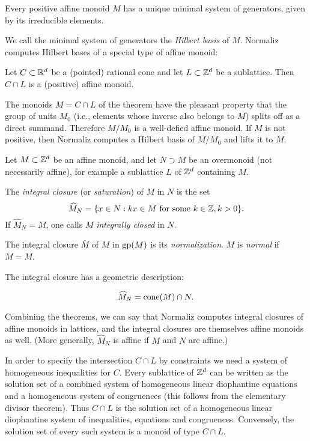 \begin{theorem}
	Every positive affine monoid $M$ has a unique minimal system of generators, given by its irreducible elements.
\end{theorem}

We call the minimal system of generators the \emph{Hilbert basis} of $M$. Normaliz computes Hilbert bases of a special type of affine monoid:

\begin{theorem}
	Let $C\subset{\mathbb R}^d$ be a (pointed) rational cone and let $L\subset {\mathbb Z}^d$ be a sublattice. Then $C\cap L$ is a (positive) affine monoid.
\end{theorem}

The monoids $M=C\cap L$ of the theorem have the pleasant property that the group of units $M_0$ (i.e., elements whose inverse also belongs to $M$) splits off as a direct summand. Therefore $M/M_0$ is a well-defied affine monoid. If $M$ is not positive, then Normaliz computes a Hilbert basis of $M/M_0$ and lifts it to $M$.

Let $M\subset {\mathbb Z}^d$ be an affine monoid, and let $N\supset M$ be an overmonoid (not necessarily affine), for example a sublattice $L$ of ${\mathbb Z}^d$ containing $M$.

\begin{definition}
	The \emph{integral closure} (or \emph{saturation}) of $M$ in $N$ is the set
	$$
	\widehat M_N=\{x\in N: kx\in M \text{ for some } k\in {\mathbb Z}, k>0\}.
	$$
	If $\widehat M_N=M$, one calls $M$ \emph{integrally closed} in $N$.
	
	The integral closure $\overline M$ of $M$ in $\operatorname{gp}(M)$ is its \emph{normalization}. $M$ is \emph{normal} if $\overline M=M$.
\end{definition}

The integral closure has a geometric description:

\begin{theorem}\label{incl_cone}
	$$
	\widehat M_N =\operatorname{cone}(M)\cap N.
	$$
\end{theorem}

Combining the theorems, we can say that Normaliz computes integral closures of affine monoids in lattices, and the integral closures are themselves affine monoids as well. (More generally, $\widehat M_N$ is affine if $M$ and $N$ are affine.)

In order to specify the intersection $C\cap L$ by constraints we need a system of homogeneous inequalities for $C$. Every sublattice of ${\mathbb Z}^d$ can be written as the solution set of a combined system of homogeneous linear diophantine equations and a homogeneous system of congruences (this follows from the elementary divisor theorem). Thus $C\cap L$ is the solution set of a homogeneous linear diophantine system of inequalities, equations and congruences. Conversely, the solution set of every such system is a monoid of type $C\cap L$.


